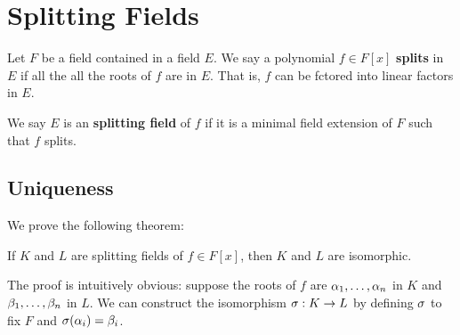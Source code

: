 \section{Splitting Fields}
Let $F$ be a field contained in a field $E$. We say a polynomial $f \in F[x]$ \textbf{splits} in $E$ if all the all the roots of $f$ are in $E$. That is, $f$ can be fctored into linear factors in $E$.

We say $E$ is an \textbf{splitting field} of $f$ if it is a minimal field extension of $F$ such that $f$ splits.

\subsection{Uniqueness}
We prove the following theorem:
\begin{center}
    If $K$ and $L$ are splitting fields of $f \in F[x]$, then $K$ and $L$ are isomorphic.
\end{center}
The proof is intuitively obvious: suppose the roots of $f$ are $\alpha_1, \dots, \alpha_n$ in $K$ and $\beta_1, \dots, \beta_n$ in $L$. We can construct the isomorphism $\sigma: K \rightarrow L$ by defining $\sigma$ to fix $F$ and $\sigma(\alpha_i) = \beta_i$.
